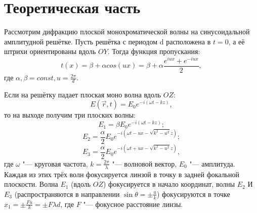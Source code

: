 \documentclass[a4paper, 12pt]{article}%
\begin{document}
\section{Теоретическая часть}
Рассмотрим дифракцию плоской монохроматической волны на синусоидальной амплитудной решётке. Пусть решётка с периодом d расположена в $t = 0$, а её штрихи ориентированы вдоль $OY$. Тогда функция пропускания:
\[
	t(x) = \beta  + \alpha cos(ux) = \beta + \alpha \frac{e^{iux} + e^{-iux}}{2},
\]
где $\alpha, \beta = const, u = \frac{2 \pi}{d}$.

Если на решётку падает плоская моно волна вдоль $OZ$:
\[
	E(\vec r, t) = E_0 e^{-i(\omega t - kz)},
\]
то на выходе получим три плоских волны:
\[
	E_1 = \beta E_0 e^{-i (\omega t - kz)};
\]
\[
	E_2 = \frac{\alpha}{2} E_0 e^{-i (\omega t - ux - \sqrt{k^2 - u^2}z)};
\]
\[
	E_3 = \frac{\alpha}{2} E_0 e^{-i (\omega t + ux - \sqrt{k^2 - u^2}z)},
\]
где $\omega$ "--- круговая частота, $k = \frac{2 \pi}{\lambda}$ "--- волновой вектор, $E_0$ "--- амплитуда.
Каждая из этих трёх волн фокусируется линзой в точку в задней фокальной плоскости. Волна $E_1$ (вдоль $OZ$) фокусируется в начало координат, волны $E_2$ И $E_3$ (распространяются в направлении $\sin \theta = \pm \frac{u}{k}$) фокусируются в точке $x_1 = \pm \frac{Fu}{k} = \pm {F \lambda}{d}$, где $F$ "--- фокусное расстояние линзы.
\end{document}
